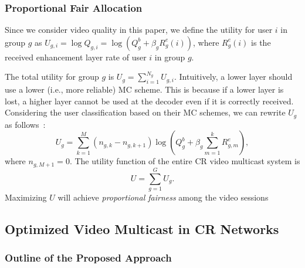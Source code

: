 \documentclass[12pt,onecolumn,draftclsnofoot]{IEEEtran} %
\begin{document}
\subsubsection{Proportional Fair Allocation \label{subsec:fairness}}

Since we consider video quality in this paper, we define the utility for user $i$ in group $g$ as $U_{g,i} = \log Q_{g,i} = \log \left( Q^b_g+\beta_g R^e_g(i) \right)$, where $R^e_g(i)$ is the received enhancement layer rate of user $i$ in group $g$.

The total utility for group $g$ is $U_g = \sum_{i=1}^{N_g} U_{g,i}$.  Intuitively, a lower layer should use a lower (i.e., more reliable) MC scheme.  This is because if a lower layer is lost, a higher layer cannot be used at the decoder even if it is correctly received.  Considering the user classification based on their MC schemes, we can rewrite $U_g$ as follows~\cite{Deb08}:
\begin{equation}
  U_g = \sum_{k=1}^M(n_{g,k}-n_{g,k+1})\log \left( Q^b_g+\beta_g \sum_{m=1}^k R_{g,m}^e \right),
\end{equation}
where $n_{g,M+1}=0$.  The utility function of the entire CR video multicast system is 
\begin{equation}
U = \sum_{g=1}^G U_g.
\end{equation}
Maximizing $U$ will achieve {\em proportional fairness} among the video sessions~\cite{Kelly98}

\subsection{Optimized Video Multicast in CR Networks \label{sec:optimized}}

\subsubsection{Outline of the Proposed Approach \label{subsec:outline}}
\end{document}
